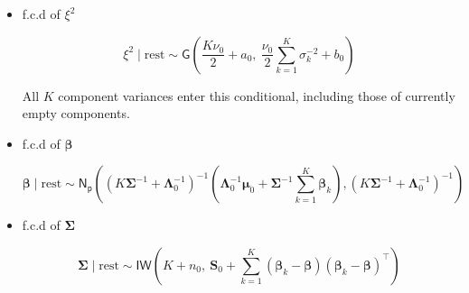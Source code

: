 \begin{itemize}
\begin{equation}
\label{CHLRM_MCMC_sigma2k}
\sigma_k^2 \mid \text{rest} \sim\mathsf{IG} \left( 
\frac{\nu_0 + \sum_{\left\lbrace j : \gamma_j = k\right\rbrace}n_j}{2},\ 
\frac{ \nu_0 \xi^2 + (\bm{y}_{k} - \bm{X}_{k} \bm{\beta}_k)^\top(\bm{y}_{k} - \bm{X}_{k} \bm{\beta}_k) }{2} 
\right)
\end{equation}

note that if cluster $k$ is empty, then the f.c.d of $\sigma_k^2$ is just $\sigma_k^2 \mid \text{rest} \sim\mathsf{IG}\left(\frac{\nu_0}{2},\frac{ \nu_0 \xi^2}{2}\right) $.

\item f.c.d of $\xi^2$

\begin{equation}
\label{CHLRM_MCMC_xi2}
\xi^2 \mid \text{rest} \sim \mathsf{G} \left(
\frac{K \nu_0}{2} + a_0,\ 
\frac{\nu_0}{2} \sum_{k=1}^{K} \sigma_k^{-2} + b_0
\right)
\end{equation}

All $K$ component variances enter this conditional, including those of currently empty components.

\item f.c.d of $\bm{\beta}$

\begin{equation}
\label{CHLRM_MCMC_Beta}
\bm{\beta} \mid \text{rest} \sim  \mathsf{N_p}\left(\left( K \bm{\Sigma}^{-1} + \bm{\Lambda}_0^{-1} \right)^{-1}\left( \bm{\Lambda}_0^{-1} \bm{\mu}_0 + \bm{\Sigma}^{-1} \sum_{k=1}^{K} \bm{\beta}_k \right), \left( K \bm{\Sigma}^{-1} + \bm{\Lambda}_0^{-1} \right)^{-1}\right)
\end{equation}

\item f.c.d of $\bm{\Sigma}$

\begin{equation}
\label{CHLRM_MCMC_Sigma}
\bm{\Sigma} \mid \text{rest} \sim \mathsf{IW} \left(
K + n_0,\ 
\bm{S}_0 + \sum_{k=1}^{K} (\bm{\beta}_k - \bm{\beta})(\bm{\beta}_k - \bm{\beta})^\top
\right)
\end{equation}


\end{itemize}

